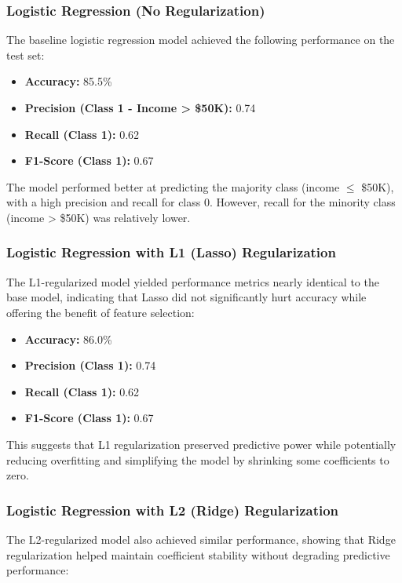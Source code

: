 \documentclass[a4paper,12pt]{article}
\begin{document}
\subsubsection*{Logistic Regression (No Regularization)}

The baseline logistic regression model achieved the following performance on the test set:

\begin{itemize}
    \item \textbf{Accuracy:} 85.5\%
    \item \textbf{Precision (Class 1 - Income > \$50K):} 0.74
    \item \textbf{Recall (Class 1):} 0.62
    \item \textbf{F1-Score (Class 1):} 0.67
\end{itemize}

The model performed better at predicting the majority class (income $\leq$ \$50K), with a high precision and recall for class 0. However, recall for the minority class (income > \$50K) was relatively lower.

\subsubsection*{Logistic Regression with L1 (Lasso) Regularization}

The L1-regularized model yielded performance metrics nearly identical to the base model, indicating that Lasso did not significantly hurt accuracy while offering the benefit of feature selection:

\begin{itemize}
    \item \textbf{Accuracy:} 86.0\%
    \item \textbf{Precision (Class 1):} 0.74
    \item \textbf{Recall (Class 1):} 0.62
    \item \textbf{F1-Score (Class 1):} 0.67
\end{itemize}

This suggests that L1 regularization preserved predictive power while potentially reducing overfitting and simplifying the model by shrinking some coefficients to zero.

\subsubsection*{Logistic Regression with L2 (Ridge) Regularization}

The L2-regularized model also achieved similar performance, showing that Ridge regularization helped maintain coefficient stability without degrading predictive performance:
\end{document}
